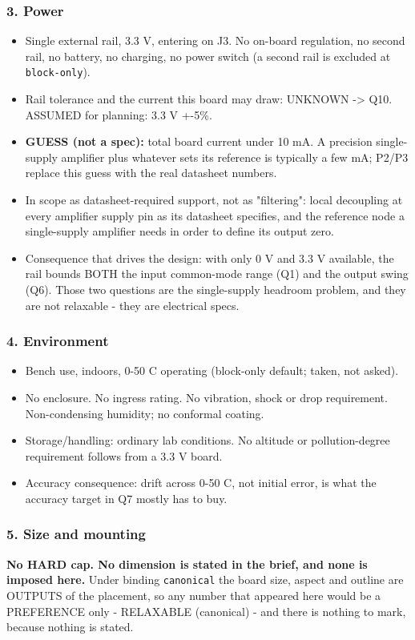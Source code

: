 \documentclass[11pt,a4paper]{article}
\begin{document}
\subsubsection*{3. Power}
\begin{itemize}
\item Single external rail, 3.3 V, entering on J3. No on-board regulation, no second
rail, no battery, no charging, no power switch (a second rail is excluded at
\texttt{block-only}).
\item Rail tolerance and the current this board may draw: UNKNOWN -\textgreater{} Q10. ASSUMED
for planning: 3.3 V +-5\%.
\item \textbf{GUESS (not a spec):} total board current under 10 mA. A precision
single-supply amplifier plus whatever sets its reference is typically a few
mA; P2/P3 replace this guess with the real datasheet numbers.
\item In scope as datasheet-required support, not as "filtering": local decoupling
at every amplifier supply pin as its datasheet specifies, and the reference
node a single-supply amplifier needs in order to define its output zero.
\item Consequence that drives the design: with only 0 V and 3.3 V available, the
rail bounds BOTH the input common-mode range (Q1) and the output swing (Q6).
Those two questions are the single-supply headroom problem, and they are not
relaxable - they are electrical specs.
\end{itemize}
\subsubsection*{4. Environment}
\begin{itemize}
\item Bench use, indoors, 0-50 C operating (block-only default; taken, not asked).
\item No enclosure. No ingress rating. No vibration, shock or drop requirement.
Non-condensing humidity; no conformal coating.
\item Storage/handling: ordinary lab conditions. No altitude or pollution-degree
requirement follows from a 3.3 V board.
\item Accuracy consequence: drift across 0-50 C, not initial error, is what the
accuracy target in Q7 mostly has to buy.
\end{itemize}
\subsubsection*{5. Size and mounting}
\textbf{No HARD cap. No dimension is stated in the brief, and none is imposed here.} Under binding \texttt{canonical} the board size, aspect and outline are OUTPUTS of the placement, so any number that appeared here would be a PREFERENCE only - RELAXABLE (canonical) - and there is nothing to mark, because nothing is stated.
\end{document}
